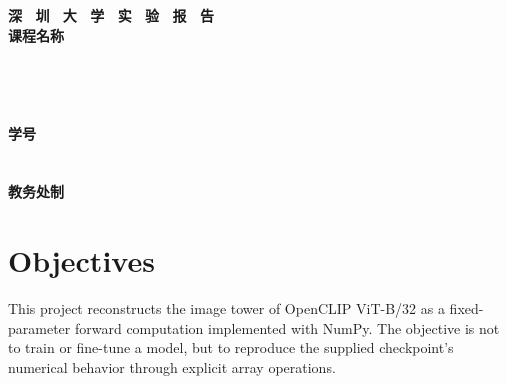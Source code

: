 \documentclass[a4paper,12pt]{article}
\begin{document}
\begin{titlepage}
    \centering
    \vspace*{2cm}
    \Huge{\textbf{深 \ 圳 \ 大 \ 学 \ 实 \ 验 \ 报 \ 告}}\\[1.5cm]

    {\Large\textbf{课程名称}\quad\underline{}}\\[0.5cm]
    {\Large
    \noindent{}
    \underline{}}\\[0.5cm]
    {\Large
    \noindent{}
    \underline{}}\\[0.5cm]
    {\Large
    \noindent{}
    \underline{}}\\[0.5cm]
    {\Large
    \noindent{}
    \underline{}}\\[0.5cm]
    {\Large
    \noindent{}
    \underline{\makebox[3cm][c]{}}
    \hspace{0.5cm}
    \textbf{学号}
    \underline{\makebox[3cm][c]{}}}\\[0.5cm]
    {\Large
    \noindent{}
    \underline{\makebox[8cm][c]{}}}\\[0.5cm]
    {\Large
    \noindent{}
    \underline{\makebox[8cm][c]{}}}\\[1.5cm]

    \vfill
    \Large{\textbf{教务处制}}
\end{titlepage}

\newpage

\section{Objectives}

This project reconstructs the image tower of OpenCLIP ViT-B/32 as a
fixed-parameter forward computation implemented with NumPy. The objective is
not to train or fine-tune a model, but to reproduce the supplied checkpoint's
numerical behavior through explicit array operations.
\end{document}
